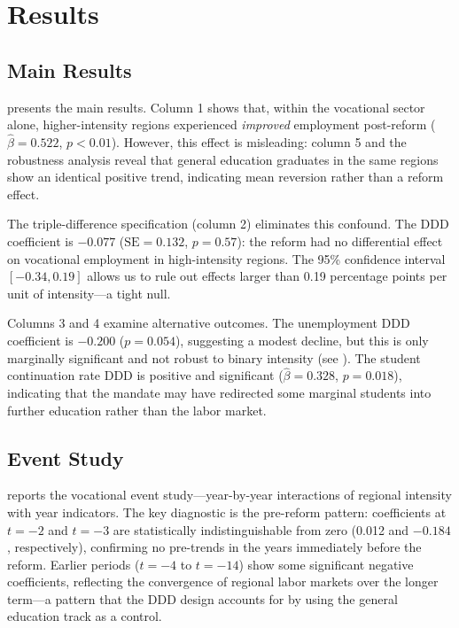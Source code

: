 \documentclass[12pt]{article}
\begin{document}
\section{Results}

\subsection{Main Results}



 presents the main results. Column 1 shows that, within the vocational sector alone, higher-intensity regions experienced \textit{improved} employment post-reform ($\hat{\beta} = 0.522$, $p < 0.01$). However, this effect is misleading: column 5 and the robustness analysis reveal that general education graduates in the same regions show an identical positive trend, indicating mean reversion rather than a reform effect.

The triple-difference specification (column 2) eliminates this confound. The DDD coefficient is $-0.077$ ($\text{SE} = 0.132$, $p = 0.57$): the reform had no differential effect on vocational employment in high-intensity regions. The 95\% confidence interval $[-0.34, 0.19]$ allows us to rule out effects larger than 0.19 percentage points per unit of intensity---a tight null.

Columns 3 and 4 examine alternative outcomes. The unemployment DDD coefficient is $-0.200$ ($p = 0.054$), suggesting a modest decline, but this is only marginally significant and not robust to binary intensity (see ). The student continuation rate DDD is positive and significant ($\hat{\beta} = 0.328$, $p = 0.018$), indicating that the mandate may have redirected some marginal students into further education rather than the labor market.

\subsection{Event Study}



 reports the vocational event study---year-by-year interactions of regional intensity with year indicators. The key diagnostic is the pre-reform pattern: coefficients at $t = -2$ and $t = -3$ are statistically indistinguishable from zero (0.012 and $-0.184$, respectively), confirming no pre-trends in the years immediately before the reform. Earlier periods ($t = -4$ to $t = -14$) show some significant negative coefficients, reflecting the convergence of regional labor markets over the longer term---a pattern that the DDD design accounts for by using the general education track as a control.
\end{document}
